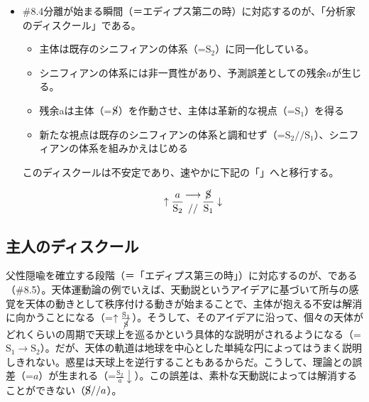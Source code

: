\begin{note}{}
  \begin{itemize}
    \tightlist
    \item{\#8.4}分離が始まる瞬間（＝エディプス第二の時）に対応するのが、「分析家のディスクール」である。
      \begin{itemize}
        \tightlist
        \item 主体は既存のシニフィアンの体系（=$\textrm{S}_2$）に同一化している。
        \item シニフィアンの体系には非一貫性があり、予測誤差としての残余$a$が生じる。
        \item 残余aは主体（=$\cancel{\textrm{S}}$）を作動させ、主体は革新的な視点（=$\textrm{S}_1$）を得る
        \item 新たな視点は既存のシニフィアンの体系と調和せず（=$\textrm{S}_2//\textrm{S}_1$）、シニフィアンの体系を組みかえはじめる
      \end{itemize}このディスクールは不安定であり、速やかに下記の「」へと移行する。

$$
\uparrow\frac{a}{\mathrm{S_2}}\genfrac{}{}{0pt}{}{\longrightarrow}{//}\frac{\cancel{\textrm{S}}}{\mathrm{S_1}}\downarrow
$$
  \end{itemize}
\end{note}

\subsection{主人のディスクール}\label{ux4e3bux4ebaux306eux30c7ux30a3ux30b9ux30afux30fcux30eb}

父性隠喩を確立する段階（＝「エディプス第三の時」）に対応するのが、である（\#8.5）。天体運動論の例でいえば、天動説というアイデアに基づいて所与の感覚を天体の動きとして秩序付ける動きが始まることで、主体が抱える不安は解消に向かうことになる（=\(\uparrow\frac{\textrm{S}_1}{\cancel{\textrm{S}}}\)）。そうして、そのアイデアに沿って、個々の天体がどれくらいの周期で天球上を巡るかという具体的な説明がされるようになる（=\(\textrm{S}_1\rightarrow\textrm{S}_2\)）。だが、天体の軌道は地球を中心とした単純な円によってはうまく説明しきれない。惑星は天球上を逆行することもあるからだ。こうして、理論との誤差（=\(a\)）が生まれる（=\(\frac{\textrm{S}_2}{a}\downarrow\)）。この誤差は、素朴な天動説によっては解消することができない（\(\cancel{\textrm{S}}//a\)）。

